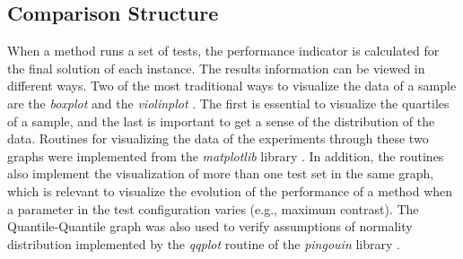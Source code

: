 		\subsection{Comparison Structure}\label{chap:proposed-methodology:library:comparison}
		
			When a method runs a set of tests, the performance indicator is calculated for the final solution of each instance. The results information can be viewed in different ways. Two of the most traditional ways to visualize the data of a sample are the \textit{boxplot} and the \textit{violinplot} \citep{chen2008handbook}. The first is essential to visualize the quartiles of a sample, and the last is important to get a sense of the distribution of the data. Routines for visualizing the data of the experiments through these two graphs were implemented from the \textit{matplotlib} library \citep{hunter2007matplotlib}. In addition, the routines also implement the visualization of more than one test set in the same graph, which is relevant to visualize the evolution of the performance of a method when a parameter in the test configuration varies (e.g., maximum contrast). The Quantile-Quantile graph was also used to verify assumptions of normality distribution implemented by the \textit{qqplot} routine of the \textit{pingouin} library \citep{vallat2018pingouin}.
			
